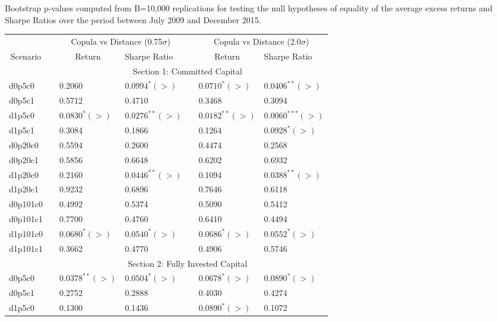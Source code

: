\documentclass[a4paper]{article}
\begin{document}
\begin{threeparttable}[H]
	\centering \scriptsize
	\caption{Bootstrap p-values computed from B=10,000 replications for testing the null hypotheses of equality of the average excess returns and Sharpe Ratios over the period between July 2009 and December 2015.}
	\begin{tabularx}{\textwidth}{@{\extracolsep{\fill}}lllllll@{}}
		\toprule
		& & \multicolumn{2}{c}{Copula vs Distance (0.75$\sigma$)} & \multicolumn{1}{c}{} & \multicolumn{2}{c}{Copula vs Distance (2.0$\sigma$)} \\
		\cmidrule{3-4}  \cmidrule{6-7}
		\multicolumn{1}{c}{Scenario} & & \multicolumn{1}{c}{Return} & Sharpe Ratio &       & \multicolumn{1}{c}{Return}& Sharpe Ratio \\
		\midrule
		& \multicolumn{6}{c}{Section 1: Committed Capital} \\
		\midrule
		d0p5c0 & & 0.2060 & $0.0994^{*}(>)$ &       & $0.0710^{*}(>)$ & $0.0406^{**}(>)$ \\
		d0p5c1 & & 0.5712 & 0.4710 &       & 0.3468 & 0.3094 \\
		d1p5c0 & & $0.0830^{*}(>)$ & $0.0276^{**}(>)$ &       & $0.0182^{**}(>)$ & $0.0060^{***}(>)$ \\
		d1p5c1 & & 0.3084 & 0.1866 &       & 0.1264 & $0.0928^{*}(>)$ \\
		d0p20c0 & & 0.5594 & 0.2600 &       & 0.4474 & 0.2568 \\
		d0p20c1 & & 0.5856 & 0.6648 &       & 0.6202 & 0.6932 \\
		d1p20c0 & & 0.2160 & $0.0446^{**}(>)$ &       & 0.1094 & $0.0388^{**}(>)$ \\
		d1p20c1 & & 0.9232 & 0.6896 &       & 0.7646 & 0.6118 \\
		d0p101c0 & & 0.4992 & 0.5374 &       & 0.5090 & 0.5412 \\
		d0p101c1 & & 0.7700 & 0.4760 &       & 0.6410 & 0.4494 \\
		d1p101c0 & & $0.0680^{*}(>)$ & $0.0540^{*}(>)$ &       & $0.0686^{*}(>)$ & $0.0552^{*}(>)$ \\
		d1p101c1 & & 0.3662 & 0.4770 &       & 0.4906 & 0.5746 \\
		\midrule
		& \multicolumn{6}{c}{Section 2:  Fully Invested Capital } \\
		\midrule
		d0p5c0 & & $0.0378^{**}(>)$ & $0.0504^{*}(>)$ &       & $0.0678^{*}(>)$ & $0.0890^{*}(>)$ \\
		d0p5c1 & & 0.2752 & 0.2888 &       & 0.4030 & 0.4274 \\
		d1p5c0 & & 0.1300 & 0.1436 &       & $0.0890^{*}(>)$ & 0.1072 \\

\end{tabularx}
\end{threeparttable}
\end{document}
